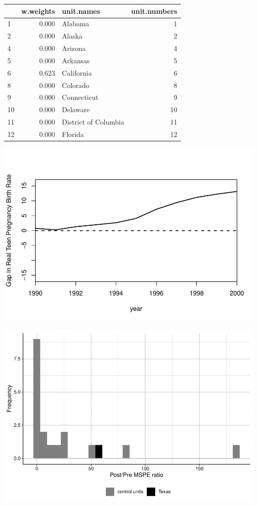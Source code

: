 \documentclass[
]{article}
\begin{document}
\begin{tabular}{l|r|l|r}
\hline
  & w.weights & unit.names & unit.numbers\\
\hline
1 & 0.000 & Alabama & 1\\
\hline
2 & 0.000 & Alaska & 2\\
\hline
4 & 0.000 & Arizona & 4\\
\hline
5 & 0.000 & Arkansas & 5\\
\hline
6 & 0.623 & California & 6\\
\hline
8 & 0.000 & Colorado & 8\\
\hline
9 & 0.000 & Connecticut & 9\\
\hline
10 & 0.000 & Delaware & 10\\
\hline
11 & 0.000 & District of Columbia & 11\\
\hline
12 & 0.000 & Florida & 12\\
\hline
\end{tabular}

\includegraphics{causal_Inf_final2_files/figure-latex/unnamed-chunk-6-1.pdf}

\includegraphics{causal_Inf_final2_files/figure-latex/unnamed-chunk-8-1.pdf}
\end{document}
